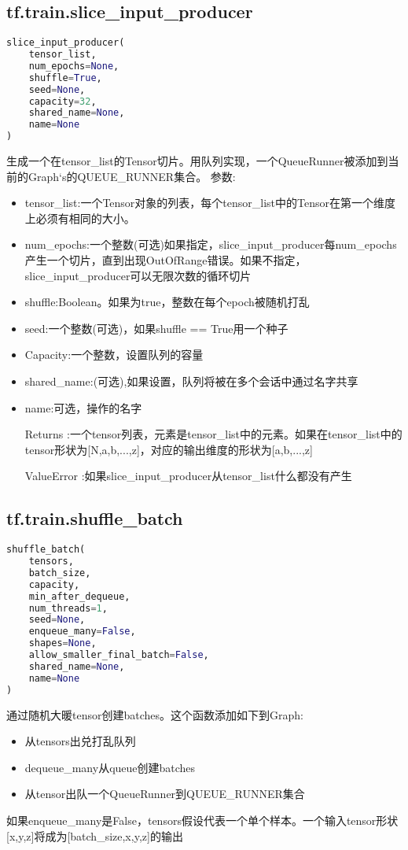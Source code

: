 \subsection{tf.train.slice\_input\_producer}
\begin{lstlisting}[language=Python]
slice_input_producer(
    tensor_list,
    num_epochs=None,
    shuffle=True,
    seed=None,
    capacity=32,
    shared_name=None,
    name=None
)
\end{lstlisting}
生成一个在tensor\_list的Tensor切片。用队列实现，一个QueueRunner被添加到当前的Graph‘s的QUEUE\_RUNNER集合。
参数:
\begin{itemize}
\item tensor\_list:一个Tensor对象的列表，每个tensor\_list中的Tensor在第一个维度上必须有相同的大小。
\item num\_epochs:一个整数(可选)如果指定，slice\_input\_producer每num\_epochs产生一个切片，直到出现OutOfRange错误。如果不指定，slice\_input\_producer可以无限次数的循环切片
\item shuffle:Boolean。如果为true，整数在每个epoch被随机打乱
\item seed:一个整数(可选)，如果shuffle == True用一个种子
\item Capacity:一个整数，设置队列的容量
\item shared\_name:(可选),如果设置，队列将被在多个会话中通过名字共享
\item name:可选，操作的名字
\item[Returns]:一个tensor列表，元素是tensor\_list中的元素。如果在tensor\_list中的tensor形状为[N,a,b,...,z]，对应的输出维度的形状为[a,b,...,z]
\item[ValueError]:如果slice\_input\_producer从tensor\_list什么都没有产生
\end{itemize}
\subsection{tf.train.shuffle\_batch}
\begin{lstlisting}[language=Python]
shuffle_batch(
    tensors,
    batch_size,
    capacity,
    min_after_dequeue,
    num_threads=1,
    seed=None,
    enqueue_many=False,
    shapes=None,
    allow_smaller_final_batch=False,
    shared_name=None,
    name=None
)
\end{lstlisting}
通过随机大暖tensor创建batches。这个函数添加如下到Graph:
\begin{itemize}
\item 从tensors出兑打乱队列
\item dequeue\_many从queue创建batches
\item 从tensor出队一个QueueRunner到QUEUE\_RUNNER集合
\end{itemize}
如果enqueue\_many是False，tensors假设代表一个单个样本。一个输入tensor形状[x,y,z]将成为[batch\_size,x,y,z]的输出

